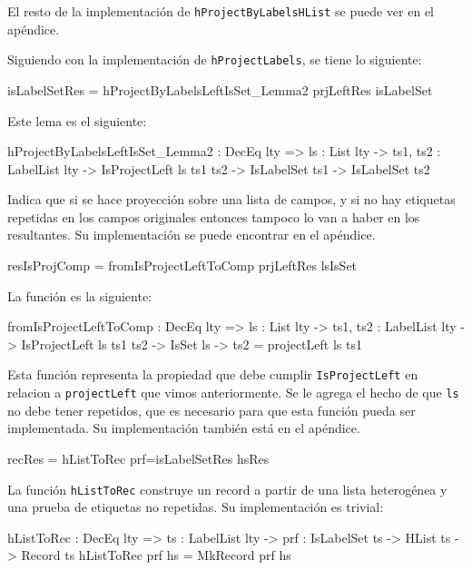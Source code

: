El resto de la implementación de \texttt{hProjectByLabelsHList} se puede ver en el apéndice.

Siguiendo con la implementación de \texttt{hProjectLabels}, se tiene lo siguiente:

\begin{code}
isLabelSetRes = 
  hProjectByLabelsLeftIsSet_Lemma2 prjLeftRes isLabelSet
\end{code}

Este lema es el siguiente:

\begin{code}
hProjectByLabelsLeftIsSet_Lemma2 : DecEq lty => {ls : List lty} -> 
  {ts1, ts2 : LabelList lty} -> IsProjectLeft ls ts1 ts2 -> 
  IsLabelSet ts1 -> IsLabelSet ts2
\end{code}

Indica que si se hace proyección sobre una lista de campos, y si no hay etiquetas repetidas en los campos originales entonces tampoco lo van a haber en los resultantes. Su implementación se puede encontrar en el apéndice.

\begin{code}
resIsProjComp = fromIsProjectLeftToComp prjLeftRes lsIsSet
\end{code}

La función es la siguiente:

\begin{code}
fromIsProjectLeftToComp : DecEq lty => {ls : List lty} -> 
  {ts1, ts2 : LabelList lty} -> IsProjectLeft ls ts1 ts2 -> 
  IsSet ls -> ts2 = projectLeft ls ts1
\end{code}

Esta función representa la propiedad que debe cumplir \texttt{IsProjectLeft} en relacion a \texttt{projectLeft} que vimos anteriormente. Se le agrega el hecho de que \texttt{ls} no debe tener repetidos, que es necesario para que esta función pueda ser implementada. Su implementación también está en el apéndice.

\begin{code}
recRes = hListToRec {prf=isLabelSetRes} hsRes
\end{code}

La función \texttt{hListToRec} construye un record a partir de una lista heterogénea y una prueba de etiquetas no repetidas. Su implementación es trivial:

\begin{code}
hListToRec : DecEq lty => {ts : LabelList lty} -> 
  {prf : IsLabelSet ts} -> HList ts -> Record ts
hListToRec {prf} hs = MkRecord prf hs
\end{code}


